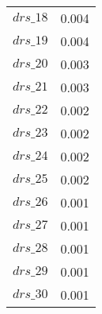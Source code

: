 \begin{center}
\begin{longtable}{cc}
$drs\_18$ 	 & 	 0.004 \\
$drs\_19$ 	 & 	 0.004 \\
$drs\_20$ 	 & 	 0.003 \\
$drs\_21$ 	 & 	 0.003 \\
$drs\_22$ 	 & 	 0.002 \\
$drs\_23$ 	 & 	 0.002 \\
$drs\_24$ 	 & 	 0.002 \\
$drs\_25$ 	 & 	 0.002 \\
$drs\_26$ 	 & 	 0.001 \\
$drs\_27$ 	 & 	 0.001 \\
$drs\_28$ 	 & 	 0.001 \\
$drs\_29$ 	 & 	 0.001 \\
$drs\_30$ 	 & 	 0.001 \\
\bottomrule%
\end{longtable}
\end{center}

